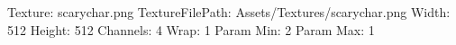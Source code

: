 Texture: scarychar.png
TextureFilePath: Assets/Textures/scarychar.png
Width: 512
Height: 512
Channels: 4
Wrap: 1
Param Min: 2
Param Max: 1